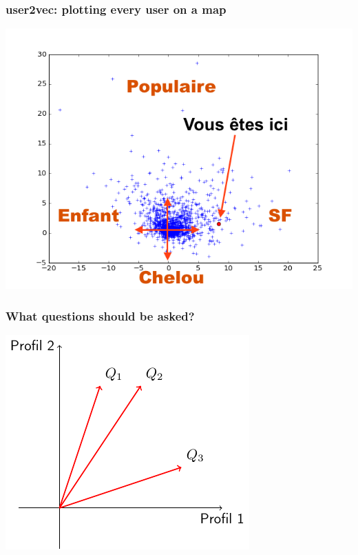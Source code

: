 \documentclass[handout]{beamer}
\begin{document}
\begin{frame}
	\frametitle{user2vec: plotting every user on a map}
	\includegraphics[width=\linewidth]{figures/here.png}
\end{frame}

\begin{frame}
  \frametitle{What questions should be asked?}
  \centering
  \includegraphics[]{figures/vectors.pdf}
\end{frame}
\end{document}
